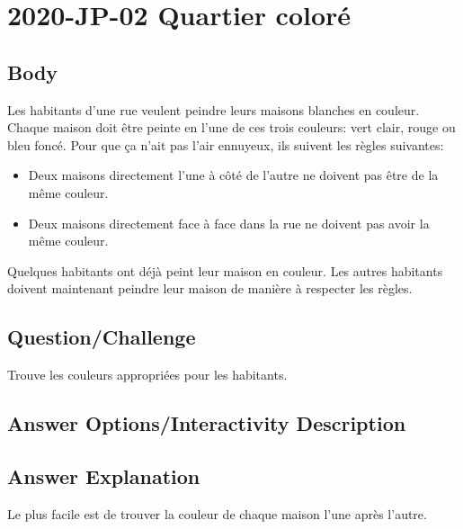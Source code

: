 \documentclass[a4paper,11pt]{report}
\newcommand{\taskGraphicsFolder}{..}
\begin{document}
\section*{\centering{} 2020-JP-02 Quartier coloré}


\subsection*{Body}

Les habitants d’une rue veulent peindre leurs maisons blanches en couleur. Chaque maison doit être peinte en l’une de ces trois couleurs: vert clair, rouge ou bleu foncé. Pour que ça n’ait pas l’air ennuyeux, ils suivent les règles suivantes:

\begin{itemize}
  \item Deux maisons directement l’une à côté de l’autre ne doivent pas être de la même couleur.
  \item Deux maisons directement face à face dans la rue ne doivent pas avoir la même couleur.
\end{itemize}

Quelques habitants ont déjà peint leur maison en couleur. Les autres habitants doivent maintenant peindre leur maison de manière à respecter les règles.

{\em

\subsection*{Question/Challenge}

Trouve les couleurs appropriées pour les habitants.

{\centering%
\par}

}\begingroup
\renewcommand{\arraystretch}{1.5}
\subsection*{Answer Options/Interactivity Description}



\endgroup

\subsection*{Answer Explanation}

Le plus facile est de trouver la couleur de chaque maison l’une après l’autre.
\end{document}
